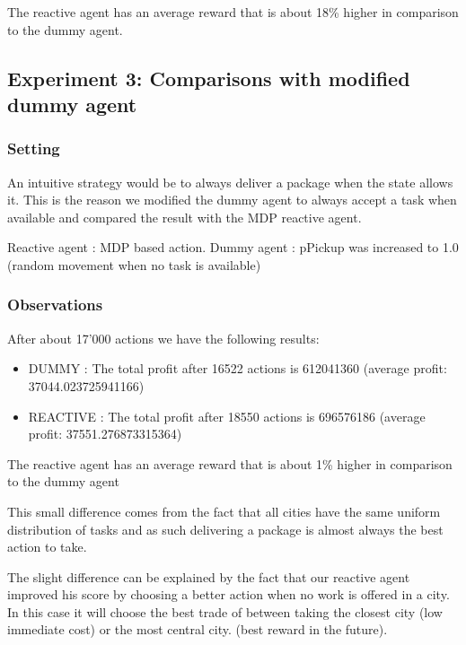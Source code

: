 \documentclass[11pt]{article}
\begin{document}
The reactive agent has an average reward that is about 18\% higher in comparison
to the dummy agent.

\subsection{Experiment 3: Comparisons with modified dummy agent}

\subsubsection{Setting}
An intuitive strategy would be to always deliver a package when the state allows
it. This is the reason we modified the dummy agent to always accept a task when
available and compared the result with the MDP reactive agent.

Reactive agent : MDP based action.
Dummy agent : pPickup was increased to 1.0 (random movement when no task is
available)

\subsubsection{Observations}
After about 17'000 actions we have the following results:
\begin{itemize}
\item DUMMY : The total profit after 16522 actions is 612041360 (average profit:
37044.023725941166)
\item REACTIVE : The total profit after 18550 actions is 696576186 (average profit:
37551.276873315364)
\end{itemize}

The reactive agent has an average reward that is about 1\% higher in comparison
to the dummy agent

This small difference comes from the fact that all cities have the same uniform
distribution of tasks and as such delivering a package is almost always the best
action to take.

The slight difference can be explained by the fact that our reactive agent
improved his score by choosing a better action when no work is offered in a
city. In this case it will choose the best trade of between taking the
closest city (low immediate cost) or the most central city. (best reward
in the future).
\end{document}
